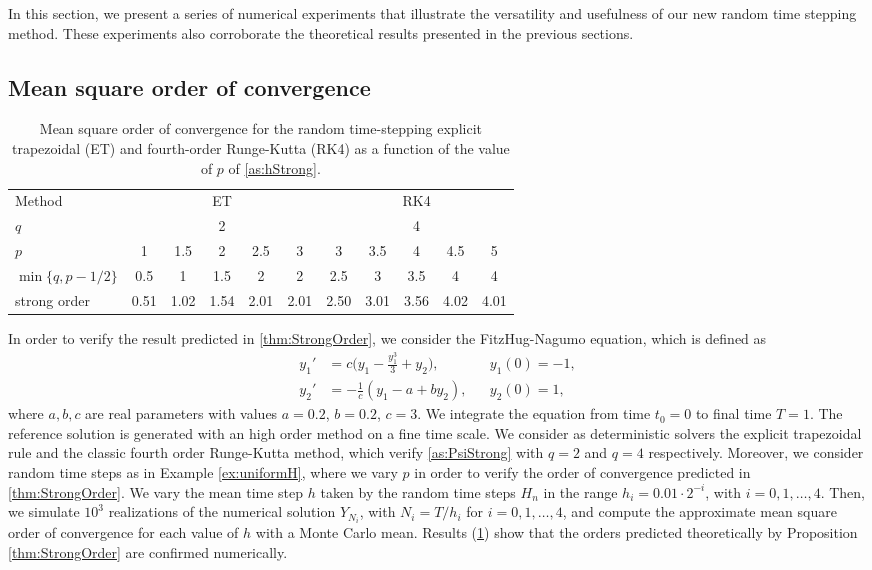 \documentclass[final,onefignum,onetabnum]{siamonline171218}
\begin{document}
In this section, we present a series of numerical experiments that illustrate the versatility and usefulness of our new random time stepping method. These experiments also corroborate the theoretical results presented in the previous sections.

\subsection{Mean square order of convergence}

\begin{table}[!t]
	\centering
	\begin{tabular}{l|ccccc|ccccc}
		\toprule
		Method & \multicolumn{5}{c|}{ET} & \multicolumn{5}{c}{RK4} \\ 
		\cmidrule(l{2pt}r{2pt}){2-6} \cmidrule(l{2pt}r{2pt}){7-11} 
		$q$ & \multicolumn{5}{c|}{2} & \multicolumn{5}{c}{4} \\
		$p$ & 1 & 1.5 & 2 & 2.5 & 3 & 3 & 3.5 & 4 & 4.5 & 5\\
		$\min\{q, p - 1/2\}$ & 0.5 & 1 & 1.5 & 2 & 2 & 2.5 & 3 & 3.5 & 4 & 4 \\
		strong order & 0.51 & 1.02 & 1.54 & 2.01 & 2.01 & 2.50 & 3.01 & 3.56 & 4.02 & 4.01 \\
		\bottomrule
	\end{tabular}
	\caption{Mean square order of convergence for the random time-stepping explicit trapezoidal (ET) and fourth-order Runge-Kutta (RK4) as a function of the value of $p$ of \cref{as:hStrong}.}
	\label{tab:NumericalResultsStrongOrder}
\end{table}

In order to verify the result predicted in \cref{thm:StrongOrder}, we consider the FitzHug-Nagumo equation, which is defined as
\begin{equation}\label{eq:FitzNag}
\begin{aligned}
y_1' &= c\big(y_1 - \frac{y_1^3}{3} + y_2\big), && y_1(0) = -1, \\
y_2' &= -\frac{1}{c}(y_1 - a + by_2), && y_2(0) = 1,
\end{aligned}
\end{equation}
where $a, b, c$ are real parameters with values $a = 0.2$, $b = 0.2$, $c = 3$. We integrate the equation from time $t_0 = 0$ to final time $T = 1$. The reference solution is generated with an high order method on a fine time scale. We consider as deterministic solvers the explicit trapezoidal rule and the classic fourth order Runge-Kutta method, which verify \cref{as:PsiStrong} with $q = 2$ and $q = 4$ respectively. Moreover, we consider random time steps as in Example \ref{ex:uniformH}, where we vary $p$ in order to verify the order of convergence predicted in \cref{thm:StrongOrder}. We vary the mean time step $h$ taken by the random time steps $H_n$ in the range $h_i = 0.01\cdot 2^{-i}$, with $i = 0, 1, \ldots, 4$. Then, we simulate $10^3$ realizations of the numerical solution $Y_{N_i}$, with $N_i = T / h_i$ for $i = 0, 1, \ldots, 4$, and compute the approximate mean square order of convergence for each value of $h$ with a Monte Carlo mean. Results (\cref{tab:NumericalResultsStrongOrder}) show that the orders predicted theoretically by Proposition \ref{thm:StrongOrder} are confirmed numerically. 
\end{document}
